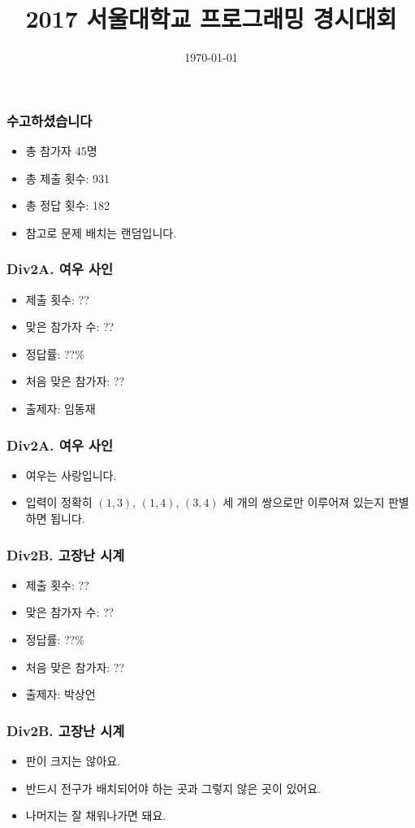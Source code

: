 \documentclass[xetex]{beamer}
\begin{document}
\title{2017 서울대학교 프로그래밍 경시대회}
\date{\today}

\frame{\titlepage}

\begin{frame}
  \frametitle{수고하셨습니다}
  \begin{itemize}
    \item 총 참가자 45명
    \item 총 제출 횟수: 931
    \item 총 정답 횟수: 182
    \item 참고로 문제 배치는 랜덤입니다.
  \end{itemize}
\end{frame}

\begin{frame}
  \frametitle{Div2A. 여우 사인}
  \begin{itemize}
    \item 제출 횟수: ??
    \item 맞은 참가자 수: ??
    \item 정답률: ??\%
    \item 처음 맞은 참가자: ??
    \item 출제자: 임동재
  \end{itemize}
\end{frame}

\begin{frame}
  \frametitle{Div2A. 여우 사인}
  \begin{itemize}
    \item 여우는 사랑입니다.
    \item 입력이 정확히 $(1, 3)$, $(1, 4)$, $(3, 4)$ 세 개의 쌍으로만 이루어져 있는지 판별하면 됩니다.
  \end{itemize}
\end{frame}

\begin{frame}
  \frametitle{Div2B. 고장난 시계}
  \begin{itemize}
    \item 제출 횟수: ??
    \item 맞은 참가자 수: ??
    \item 정답률: ??\%
    \item 처음 맞은 참가자: ??
    \item 출제자: 박상언
  \end{itemize}
\end{frame}

\begin{frame}
  \frametitle{Div2B. 고장난 시계}
  \begin{itemize}
    \item 판이 크지는 않아요.
    \item 반드시 전구가 배치되어야 하는 곳과 그렇지 않은 곳이 있어요.
    \item 나머지는 잘 채워나가면 돼요.
  \end{itemize}
\end{frame}
\end{document}
